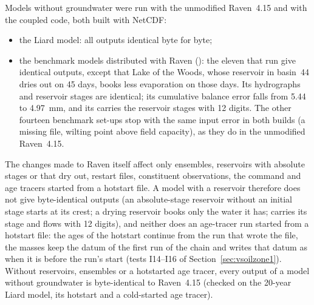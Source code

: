 Models without
groundwater were run with the unmodified Raven~4.15 and with the coupled code, both built with NetCDF:
\begin{itemize}
\item the Liard model: all outputs identical byte for byte;
\item the benchmark models distributed with Raven (): the eleven that run give identical
      outputs, except that Lake of the Woods, whose reservoir in basin~44 dries out on 45 days, books less evaporation on
      those days. Its hydrographs and reservoir stages are identical; its
      cumulative balance error falls from 5.44 to 4.97~mm, and its  carries the reservoir stages with 12
      digits. The other fourteen benchmark set-ups stop with the same input error in both builds (a missing  file,
      wilting point above field capacity), as they do in the unmodified Raven~4.15.
\end{itemize}
The changes made to Raven itself affect only ensembles, reservoirs with absolute stages or
that dry out, restart files, constituent observations, the  command and age tracers started from a
hotstart file. A model with a reservoir therefore does not give byte-identical outputs (an absolute-stage reservoir
without an initial stage starts at its crest; a drying reservoir books only the water it has;  carries
its stage and flows with 12 digits), and neither does an age-tracer run started from a hotstart file: the ages of the
hotstart continue from the run that wrote the file, the masses keep the datum of the first run of the chain and  writes that datum as
 when it is before the run's start (tests I14--I16 of Section~\ref{sec:vsoilzone1}). Without reservoirs, ensembles or a hotstarted age tracer,
every output of a model without groundwater is byte-identical to Raven~4.15 (checked on the 20-year
Liard model, its hotstart and a cold-started age tracer).

